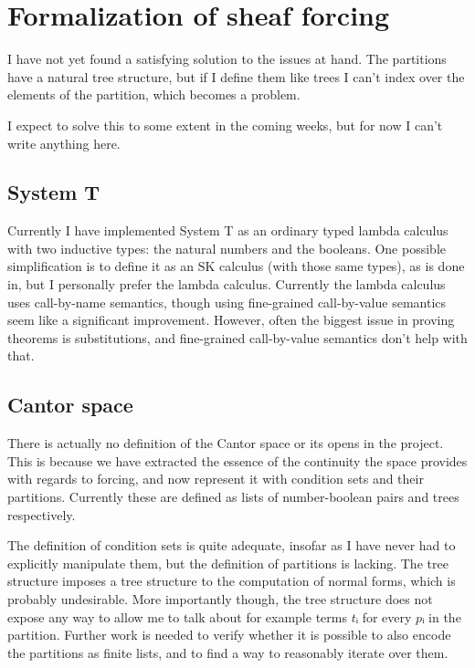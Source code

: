 \documentclass{article}
\begin{document}
\section{Formalization of sheaf forcing}

I have not yet found a satisfying solution to the issues at hand.
The partitions have a natural tree structure, but if I define them like trees I
can't index over the elements of the partition, which becomes a problem.

I expect to solve this to some extent in the coming weeks, but for now I can't
write anything here.

\subsection{System T}
Currently I have implemented System T as an ordinary typed lambda calculus with
two inductive types: the natural numbers and the booleans. One possible
simplification is to define it as an \(\mathrm{SK}\) calculus (with those same
types), as is done in\cite{dialogue}, but I personally prefer the lambda
calculus.
Currently the lambda calculus uses call-by-name semantics, though using
fine-grained call-by-value semantics seem like a significant improvement.
However, often the biggest issue in proving theorems is substitutions, and
fine-grained call-by-value semantics don't help with that.

\subsection{Cantor space}
There is actually no definition of the Cantor space or its opens in the project.
This is because we have extracted the essence of the continuity the space
provides with regards to forcing, and now represent it with condition sets and
their partitions. Currently these are defined as lists of number-boolean pairs
and trees respectively.

The definition of condition sets is quite adequate, insofar as I have never had
to explicitly manipulate them, but the definition of partitions is lacking. The
tree structure imposes a tree structure to the computation of normal forms,
which is probably undesirable. More importantly though, the tree structure does
not expose any way to allow me to talk about for example terms \(tᵢ\) for every
\(pᵢ\) in the partition. Further work is needed to verify whether it is possible
to also encode the partitions as finite lists, and to find a way to reasonably
iterate over them.
\end{document}
